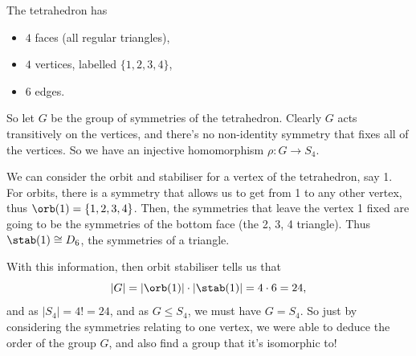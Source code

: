 \documentclass[a4paper]{scrartcl}
\begin{document}
\begin{center}
\end{center}


The tetrahedron has
\begin{itemize}
	\item $4$ faces (all regular triangles),
	\item $4$ vertices, labelled $\{1, 2, 3, 4\}$,
	\item $6$ edges.
\end{itemize}

So let $G$ be the group of symmetries of the tetrahedron. Clearly $G$ acts transitively on the vertices, and there's no non-identity symmetry that fixes all of the vertices. So we have an injective homomorphism $\rho : G \rightarrow S_4$.

We can consider the orbit and stabiliser for a vertex of the tetrahedron, say 1. For orbits, there is a symmetry that allows us to get from 1 to any other vertex, thus $\orb(1) = \{1, 2, 3, 4\}$. Then, the symmetries that leave the vertex 1 fixed are going to be the symmetries of the bottom face (the 2, 3, 4 triangle). Thus $\stab(1) \cong D_6$, the symmetries of a triangle. 

With this information, then orbit stabiliser tells us that
$$
|G| = |\orb(1)| \cdot |\stab(1)| = 4 \cdot 6 = 24,
$$
and as $|S_4| = 4! = 24$, and as $G \leq S_4$, we must have $G = S_4$. So just by considering the symmetries relating to one vertex, we were able to deduce the order of the group $G$, and also find a group that it's isomorphic to!
\end{document}
